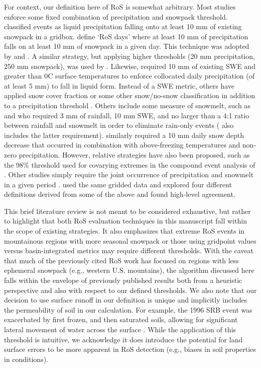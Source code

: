 \documentclass[nhess, manuscript]{copernicus}
\begin{document}
For context, our definition here of RoS is somewhat arbitrary. Most studies enforce some fixed combination of precipitation and snowpack threshold.
\citet{ye2008winter} classified events as liquid precipitation falling onto at least 10 mm of existing snowpack in a gridbox.
\citet{musselman2018projected} define `RoS days' where at least 10 mm of precipitation falls on at least 10 mm of snowpack in a given day.
This technique was adopted by \citet{lopez2021changes} and \citet{maina2023diverging}.
A similar strategy, but applying higher thresholds (20 mm precipitation, 250 mm snowpack), was used by \citet{wurzer2016influence}.
Likewise, \citet{hotovy2023changes} required 10 mm of existing SWE and greater than 0\degree{}C surface temperatures to enforce collocated daily precipitation (of at least 5 mm) to fall in liquid form.
Instead of a SWE metric, others have applied snow cover fraction or some other snow/no-snow classification in addition to a precipitation threshold \citep{mazurkiewicz2008assessing,pradhanang2013rain,cohen2015trends}.
Others include some measure of snowmelt, such as \citet{freudiger2014large} and \citet{li2019the} who required 3 mm of rainfall, 10 mm SWE, and no larger than a 4:1 ratio between rainfall and snowmelt in order to eliminate rain-only events (\citet{musselman2018projected} also includes the latter requirement).
\citet{suriano2022north} similarly required a 10 mm daily snow depth decrease that occurred in combination with above-freezing temperatures and non-zero precipitation.
However, relative strategies have also been proposed, such as the 98\% threshold used for covarying extremes in the compound event analysis of \citet{poschlod2020climate}.
Other studies simply require the joint occurrence of precipitation and snowmelt in a given period \citep{mccabe2007rain,surfleet2013variability,collins2014annual,guan2016hydrometeorological,jeong2018rain}.
\citet{wachowicz2020rain} used the same gridded data and explored four different definitions derived from some of the above and found high-level agreement.

This brief literature review is not meant to be considered exhaustive, but rather to highlight that both RoS evaluation techniques in this manuscript fall within the scope of existing strategies. It also emphasizes that extreme RoS events in mountainous regions with more seasonal snowpack or those using gridpoint values versus basin-integrated metrics may require different thresholds. With the caveat that much of the previously cited RoS work has focused on regions with less ephemeral snowpack (e.g., western U.S. mountains), the algorithm discussed here falls within the envelope of previously published results both from a heuristic perspective and also with respect to our defined thresholds. We also note that our decision to use surface runoff in our definition is unique and implicitly includes the permeability of soil in our calculation. For example, the 1996 SRB event was exacerbated by first frozen, and then saturated soils, allowing for significant lateral movement of water across the surface \citep{yarnal1997the}. While the application of this threshold is intuitive, we acknowledge it does introduce the potential for land surface errors to be more apparent in RoS detection (e.g., biases in soil properties in conditions).
\end{document}
